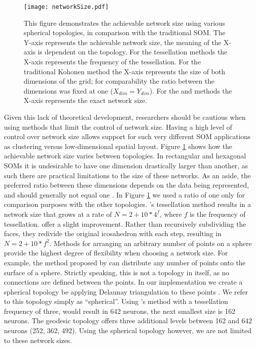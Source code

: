 \begin{figure}[htb]
\centering
\texttt{[image: networkSize.pdf]}
\caption{This figure demonstrates the achievable network size using various
spherical topologies, in comparison with the traditional SOM. The Y-axis
represents the achievable network size, the meaning of the X-axis is dependent
on the topology. For the tessellation methods the X-axis represents the
frequency of the tessellation. For the traditional Kohonen method the X-axis
represents the size of both dimensions of the grid; for comparability the
ratio between the dimensions was fixed at one ($X_{dim}=Y_{dim}$).  For the
\cite{Rakhmanov94} and \cite{Nishio:2006fk} methods the X-axis represents the
exact network size.}
\label{fig:nSize}
\end{figure}

Given this lack of theoretical development, researchers should be cautious
when using methods that limit the control of network size.  Having a high
level of control over network size allows support for such very different SOM
applications as clustering versus low-dimensional spatial layout.
Figure \ref{fig:nSize} shows how the achievable network size varies between
topologies.  In rectangular and hexagonal SOMs it is undesirable to have one dimension
drastically larger than another, as such there are practical limitations to
the size of these networks.  As an aside, the preferred ratio between these
dimensions depends on the data being represented, and should generally not
equal one \citep{kohonen1996, toolbox}.  In Figure \ref{fig:nSize} we used a
ratio of one only for comparison purposes with the other topologies.
\citeauthor{ritter99}'s tessellation method results in a network size that
grows at a rate of \(N=2+10*4^f\), where $f$ is the frequency of tessellation.
\cite{wu2006} offer a slight improvement. Rather than recursively subdividing
the faces, they redivide the original icosahedron with each step, resulting in
\(N=2+10*f^2\).  Methods for arranging an arbitrary number of points on a
sphere provide the highest degree of flexibility when choosing a network
size.  For example, the method proposed by \cite{Rakhmanov94} can
distribute any number of points onto the surface of a sphere.  Strictly
speaking, this is not a topology in itself, as no connections are defined
between the points. In our implementation we create a spherical topology be
applying Delaunay triangulation to these points \citep{Ranka97}.  We refer to
this topology simply as ``spherical''. Using \citeauthor{ritter99}'s method
with a tessellation frequency of three, would result in 642 neurons, the next
smallest size is 162 neurons.  The geodesic topology offers three additional
levels between 162 and 642 neurons (252, 362, 492).  Using the spherical
topology however, we are not limited to these network sizes.

